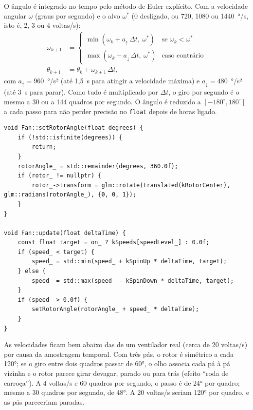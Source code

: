 \documentclass[
  12pt,          %
  oneside,       %
  a4paper,       %
  chapter=TITLE, %
  english,
  brazil,        %
]{abntex2}
\newcommand{\fonteautores}{\fonte{Elaborado pelos autores (2026).}}
\begin{document}
O ângulo é integrado no tempo pelo método de Euler explícito. Com a velocidade angular $\omega$ (graus por
segundo) e o alvo $\omega^{*}$ ($0$ desligado, ou 720, 1080 ou 1440~°/s, isto é, 2, 3 ou 4 voltas/s):
\begin{align}
  \omega_{k+1} &=
  \begin{cases}
    \min(\omega_k + a_{\uparrow}\,\Delta t,\ \omega^{*}) & \text{se } \omega_k < \omega^{*} \\
    \max(\omega_k - a_{\downarrow}\,\Delta t,\ \omega^{*}) & \text{caso contrário}
  \end{cases} \\
  \theta_{k+1} &= \theta_k + \omega_{k+1}\,\Delta t,
\end{align}
com $a_{\uparrow} = 960$~°/s² (até 1,5~s para atingir a velocidade máxima) e $a_{\downarrow} = 480$~°/s²
(até 3~s para parar). Como tudo é multiplicado por $\Delta t$, o giro por segundo é o mesmo a 30 ou a
144 quadros por segundo. O ângulo é reduzido a $[-180^\circ, 180^\circ]$ a cada passo para não perder precisão no
\texttt{float} depois de horas ligado.

\begin{lstlisting}[caption={Rotação do rotor (\texttt{src/objects/fan.cpp}, sem comentários)},label={cod:rotacao}]
void Fan::setRotorAngle(float degrees) {
    if (!std::isfinite(degrees)) {
        return;
    }
    rotorAngle_ = std::remainder(degrees, 360.0f);
    if (rotor_ != nullptr) {
        rotor_->transform = glm::rotate(translated(kRotorCenter), glm::radians(rotorAngle_), {0, 0, 1});
    }
}

void Fan::update(float deltaTime) {
    const float target = on_ ? kSpeeds[speedLevel_] : 0.0f;
    if (speed_ < target) {
        speed_ = std::min(speed_ + kSpinUp * deltaTime, target);
    } else {
        speed_ = std::max(speed_ - kSpinDown * deltaTime, target);
    }
    if (speed_ > 0.0f) {
        setRotorAngle(rotorAngle_ + speed_ * deltaTime);
    }
}
\end{lstlisting}
\fonteautores

As velocidades ficam bem abaixo das de um ventilador real (cerca de 20 voltas/s) por causa da amostragem
temporal. Com três pás, o rotor é simétrico a cada 120°; se o giro entre dois quadros passar de 60°, o olho
associa cada pá à pá vizinha e o rotor parece girar devagar, parado ou para trás (efeito ``roda de carroça'').
A 4 voltas/s e 60 quadros por segundo, o passo é de 24° por quadro; mesmo a 30 quadros por segundo, de 48°.
A 20 voltas/s seriam 120° por quadro, e as pás pareceriam paradas.
\end{document}
